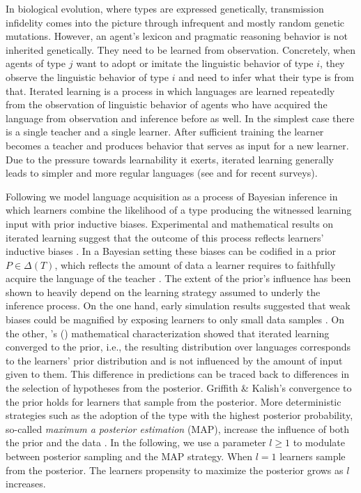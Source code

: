 \documentclass[a4paper]{article}
\newcommand{\citeposs}[2][]{\citeauthor{#2}'s (\citeyear[#1]{#2})}
\begin{document}
In biological evolution, where types are expressed genetically, transmission infidelity comes
into the picture through infrequent and mostly random genetic mutations. However, an agent's lexicon
and pragmatic reasoning behavior is not inherited genetically. They need to be learned from
observation. Concretely, when agents of type $j$ want to adopt or imitate the linguistic
behavior of type $i$, they observe the linguistic behavior of type $i$ and need to infer what
their type is from that. Iterated learning is a process in which languages are learned repeatedly from the observation
of linguistic behavior of agents who have acquired the language from observation and inference
before as well. In the simplest case there is a single teacher and a single
learner. After sufficient training the learner becomes a teacher and produces behavior that
serves as input for a new learner. Due to the pressure towards learnability it exerts, iterated
learning generally leads to simpler and more regular languages (see \citealt{kirby+etal:2014}
and \citealt{tamariz+kirby:2016} for recent surveys). 

Following \citet{griffiths+kalish:2007} we model language acquisition as a process of Bayesian
inference in which learners combine the likelihood of a type producing the witnessed learning
input with prior inductive biases. Experimental and mathematical results on iterated learning
suggest that the outcome of this process reflects learners' inductive biases
\citep[e.g.,][]{kirby+etal:2014}. In a Bayesian setting these biases can be codified in a prior
$P \in \Delta(T)$, which reflects the amount of data a learner requires to faithfully acquire
the language of the teacher \citep[cf.][450]{griffiths+kalish:2007}. The extent of the prior's
influence has been shown to heavily depend on the learning strategy assumed to underly the
inference process. On the one hand, early simulation results suggested that weak biases could
be magnified by exposing learners to only small data samples \citep[e.g., in][]{brighton:2002}. On the other, \citeposs{griffiths+kalish:2007} mathematical
characterization showed that iterated learning converged to the prior, i.e., the resulting
distribution over languages corresponds to the learners' prior distribution and is not
influenced by the amount of input given to them. This difference in predictions can be traced
back to differences in the selection of hypotheses from the posterior. Griffith \& Kalish's
convergence to the prior holds for learners that sample from the posterior. More deterministic
strategies such as the adoption of the type with the highest posterior probability, so-called
{\it maximum a posterior estimation} (MAP), increase the influence of both the prior and the
data \citep{griffiths+kalish:2007,kirby+etal:2007}. In the following, we use a parameter
$l\ge1$ to modulate between posterior sampling and the MAP strategy. When $l = 1$ learners
sample from the posterior. The learners propensity to maximize the posterior grows as $l$
increases.
\end{document}
